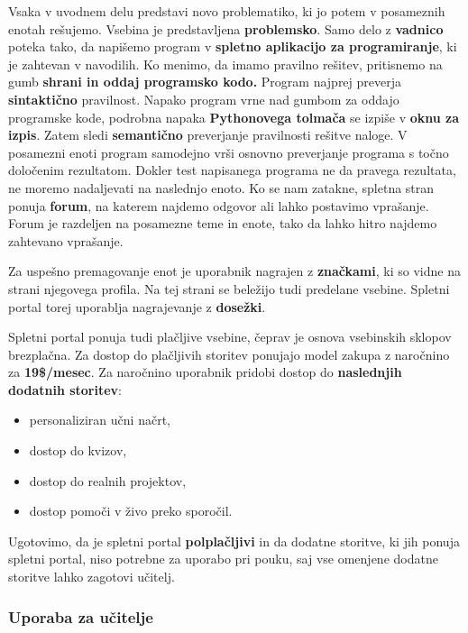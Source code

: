 Vsaka v uvodnem delu predstavi novo problematiko, ki jo potem v
posameznih enotah rešujemo. Vsebina je predstavljena
\textbf{problemsko}. Samo delo z \textbf{vadnico} poteka tako, da
napišemo program v \textbf{spletno aplikacijo za programiranje}, ki je
zahtevan v navodilih. Ko menimo, da imamo pravilno rešitev, pritisnemo
na gumb \textbf{shrani in oddaj programsko kodo.} Program najprej
preverja \textbf{sintaktično} pravilnost. Napako program vrne nad
gumbom za oddajo programske kode, podrobna napaka \textbf{Pythonovega
  tolmača} se izpiše v \textbf{oknu za izpis}. Zatem sledi
\textbf{semantično} preverjanje pravilnosti rešitve naloge. V
posamezni enoti program samodejno vrši osnovno preverjanje programa s
točno določenim rezultatom. Dokler test napisanega programa ne da
pravega rezultata, ne moremo nadaljevati na naslednjo enoto. Ko se nam
zatakne, spletna stran ponuja \textbf{forum}, na katerem najdemo
odgovor ali lahko postavimo vprašanje. Forum je razdeljen na posamezne
teme in enote, tako da lahko hitro najdemo zahtevano vprašanje.

Za uspešno premagovanje enot je uporabnik nagrajen z
\textbf{značkami}, ki so vidne na strani njegovega profila. Na tej
strani se beležijo tudi predelane vsebine. Spletni portal torej
uporablja nagrajevanje z \textbf{dosežki}.

Spletni portal ponuja tudi plačljive vsebine, čeprav je osnova
vsebinskih sklopov brezplačna. Za dostop do plačljivih storitev 
ponujajo model zakupa z naročnino za  \textbf{19\$/mesec}. Za
naročnino uporabnik pridobi dostop do\textbf{ naslednjih dodatnih
  storitev}:

\begin{itemize}
\item personaliziran učni načrt,
\item dostop do kvizov,
\item dostop do realnih projektov,
\item dostop pomoči v živo preko sporočil.
\end{itemize}

Ugotovimo, da je spletni portal \textbf{polplačljivi} in da dodatne
storitve, ki jih ponuja spletni portal, niso potrebne za uporabo pri
pouku, saj vse omenjene dodatne storitve lahko zagotovi učitelj.

\subsubsection{Uporaba za učitelje}
\label{sec:uporaba_učitelji}

